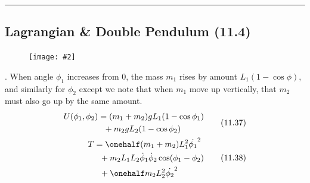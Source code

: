 \documentclass[10pt, twocolumn]{article}
\newcommand\myfig[2][0.3\textwidth]{\begin{figure}[h!]\centering\texttt{[image: \#2]}\end{figure}}
\newcommand{\myspace}{\vspace{3\bigskipamount}}
\newcommand\p{\Needspace{10\baselineskip} \noindent}
\newcommand\tlab[1]{\tag{#1}\label{#1}}
\begin{document}
\myspace
\hrule
\subsection{Lagrangian \& Double Pendulum (11.4)}
\myfig[0.25\textwidth]{DPend.PNG} 


\p {}. When angle $\phi_1$ increases from 0, the mass $m_1$ rises by amount $L_1(1 - \cos\phi)$, and similarly for $\phi_2$ except we note that when $m_1$ move up vertically, that $m_2$ must also go up by the same amount. 
\begin{align}
\begin{split}
	U(\phi_1, \phi_2) &= (m_1 + m_2)g L_1 (1 - \cos\phi_1)\\
	 &~~ + m_2 g L_2(1 - \cos\phi_2)
\end{split}\tlab{11.37}\\
\begin{split}
	T &= \onehalf (m_1 + m_2) L_1^2 \dot{\phi_1}^2 \\
	&~~	+ m_2 L_1 L_2 \dot{\phi}_1\dot{\phi}_2\cos(\phi_1 - \phi_2) \\
	&~~	+  \onehalf m_2 L_2^2 \dot{\phi_2}^2 
\end{split}\tlab{11.38}
\end{align}
\end{document}
